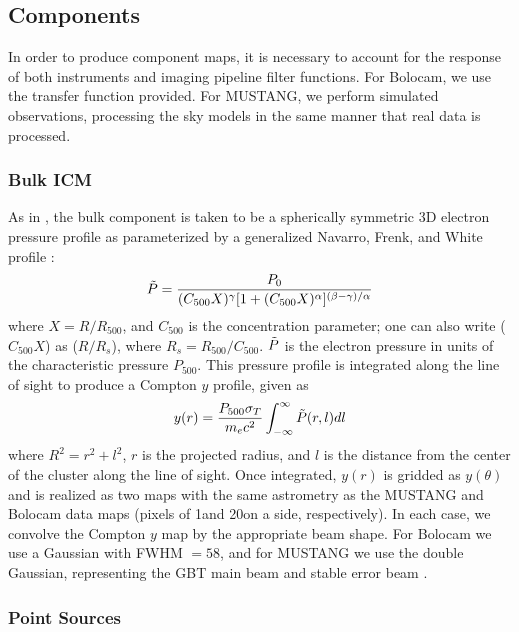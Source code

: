 \documentclass[iop,numberedappendix,apj]{emulateapj}
\begin{document}
\subsection{Components}
\label{sec:components}

In order to produce component maps, it is necessary to account for the response of both instruments and
imaging pipeline filter functions. For Bolocam, we use the transfer function provided. For MUSTANG, we
perform simulated observations, processing the sky models in the same manner that real data is processed.

\subsubsection{Bulk ICM}
\label{sec:bulk_ICM}

 As in \citet{romero2015a}, the bulk component is taken to be a 
spherically symmetric 3D electron pressure profile as parameterized by a generalized Navarro, Frenk,
and White profile \citep[hereafter, gNFW][]{navarro1997,nagai2007}:
\begin{equation}
  \Tilde{P} = \frac{P_0}{(C_{500} X)^{\gamma} [1 + (C_{500} X)^{\alpha}]^{(\beta - \gamma)/\alpha}}
  \label{eqn:gnfw}
\end{equation}
where $X = R / R_{500}$, and $C_{500}$ is the concentration parameter; one can also write ($C_{500} X$) as
($R / R_s$), where $R_s = R_{500}/C_{500}$. $\Tilde{P}$ is the electron pressure in units of the characteristic
pressure $P_{500}$. This pressure profile is integrated along the line of sight to produce 
a Compton $y$ profile, given as 
\begin{equation}
  y(r) = \frac{P_{500} \sigma_{T}}{m_e c^2} \int_{-\infty}^{\infty} \Tilde{P}(r,l) dl
  \label{eqn:compton_y}
\end{equation}
where $R^2 = r^2 + l^2$, $r$ is the projected radius, and $l$ is the distance from the center of the cluster
along the line of sight. Once integrated, $y(r)$ is gridded as $y(\theta)$ and is realized as two maps with
the same astrometry as the MUSTANG and Bolocam data maps (pixels of 1\asecs and 20\asecs on a side, respectively). 
In each case, we convolve the Compton $y$ map by the appropriate beam shape. For Bolocam we use a Gaussian with FWHM
$= 58$\asec, and for MUSTANG we use the double Gaussian, representing the GBT main beam and stable error beam
\cite{romero2015a}.

\subsubsection{Point Sources}
\label{sec:ptsrcs}
\end{document}
